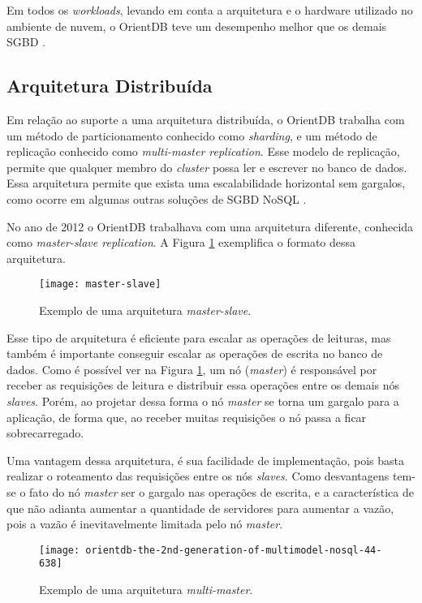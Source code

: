 	Em todos os \textit{workloads}, levando em conta a arquitetura e o hardware utilizado no ambiente de nuvem, o OrientDB teve um desempenho melhor que os demais SGBD \cite{dayarathna2012xgdbench}.
	
	
\subsection{Arquitetura Distribuída} \label{orient_distributed}
	Em relação ao suporte a uma arquitetura distribuída, o OrientDB trabalha com um método de particionamento conhecido como \textit{sharding}, e um método de replicação conhecido como \textit{multi-master replication}. Esse modelo de replicação, permite que qualquer membro do \textit{cluster} possa ler e escrever no banco de dados. Essa arquitetura permite que exista uma escalabilidade horizontal sem gargalos, como ocorre em algumas outras soluções de SGBD NoSQL \cite{kauremerging}.
	
	No ano de 2012 o OrientDB trabalhava com uma arquitetura diferente, conhecida como \textit{master-slave replication}. A Figura \ref{fig:master-slave} exemplifica o formato dessa arquitetura.
	
\begin{figure}[h]
	\centering
    \texttt{[image: master-slave]}
    \caption{Exemplo de uma arquitetura \textit{master-slave}.}
    \label{fig:master-slave}
\end{figure}

	Esse tipo de arquitetura é eficiente para escalar as operações de leituras, mas também é importante conseguir escalar as operações de escrita no banco de dados. Como é possível ver na Figura \ref{fig:master-slave}, um nó (\textit{master}) é responsável por receber as requisições de leitura e distribuir essa operações entre os demais nós \textit{slaves}. Porém, ao projetar dessa forma o nó \textit{master} se torna um gargalo para a aplicação, de forma que, ao receber muitas requisições o nó passa a ficar sobrecarregado.
	
	Uma vantagem dessa arquitetura, é sua facilidade de implementação, pois basta realizar o roteamento das requisições entre os nós \textit{slaves}. Como desvantagens tem-se o fato do nó \textit{master} ser o gargalo nas operações de escrita, e a característica de que não adianta aumentar a quantidade de servidores para aumentar a vazão, pois a vazão é inevitavelmente limitada pelo nó \textit{master}.
	
\begin{figure}[h]
	\centering
    \texttt{[image: orientdb-the-2nd-generation-of-multimodel-nosql-44-638]}
    \caption{Exemplo de uma arquitetura \textit{multi-master}.}
    \label{fig:multi-master}
\end{figure}
	
